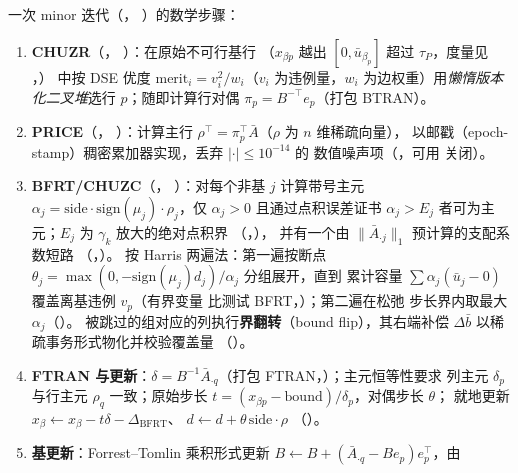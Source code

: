 \documentclass[11pt]{ctexart}
\begin{document}
一次 minor 迭代（，
）的数学步骤：
\begin{enumerate}[label=\textbf{S\arabic*.},leftmargin=3em]
\item \textbf{CHUZR}（，
）：在原始不可行基行
（$x_{\beta p}$ 越出 $[0,\bar u_{\beta_p}]$ 超过 $\tau_P$，度量见
，）
中按 DSE 优度 $\mathrm{merit}_i = v_i^{2}/w_i$（$v_i$ 为违例量，$w_i$
为边权重）用\emph{懒惰版本化二叉堆}选行 $p$；随即计算行对偶
$\pi_p = B^{-\top} e_p$（打包 BTRAN）。
\item \textbf{PRICE}（，
）：计算主行
$\rho^{\top} = \pi_p^{\top} \bar A$（$\rho$ 为 $n$ 维稀疏向量），
以邮戳（epoch-stamp）稠密累加器实现，丢弃 $|\cdot|\le 10^{-14}$ 的
数值噪声项（，可用
 关闭）。
\item \textbf{BFRT/CHUZC}（，
）：对每个非基 $j$ 计算带号主元
$\alpha_j = \mathrm{side}\cdot\mathrm{sign}(\mu_j)\cdot\rho_j$，仅
$\alpha_j > 0$ 且通过点积误差证书 $\alpha_j > E_j$ 者可为主元；$E_j$
为 $\gamma_k$ 放大的绝对点积界
（，），
并有一个由 $\|\bar A_{\cdot j}\|_1$ 预计算的支配系数短路
（，）。
按 Harris 两遍法：第一遍按断点
$\theta_j = \max(0,-\mathrm{sign}(\mu_j)d_j)/\alpha_j$ 分组展开，直到
累计容量 $\sum \alpha_j (\bar u_j - 0)$ 覆盖离基违例 $v_p$（有界变量
比测试 BFRT，）；第二遍在松弛
步长界内取最大 $\alpha_j$（）。
被跳过的组对应的列执行\textbf{界翻转}（bound flip），其右端补偿
$\Delta\bar b$ 以稀疏事务形式物化并校验覆盖量
（）。
\item \textbf{FTRAN 与更新}：$\delta = B^{-1}\bar A_{\cdot q}$（打包
FTRAN，）；主元恒等性要求
列主元 $\delta_p$ 与行主元 $\rho_q$ 一致；原始步长
$t = (x_{\beta p} - \text{bound})/\delta_p$，对偶步长 $\theta$；
就地更新 $x_\beta \leftarrow x_\beta - t\delta - \Delta_{\mathrm{BFRT}}$、
$d \leftarrow d + \theta\,\mathrm{side}\cdot\rho$
（）。
\item \textbf{基更新}：Forrest--Tomlin 乘积形式更新
$B \leftarrow B + (\bar A_{\cdot q} - B e_p)e_p^{\top}$，由

\end{enumerate}
\end{document}

